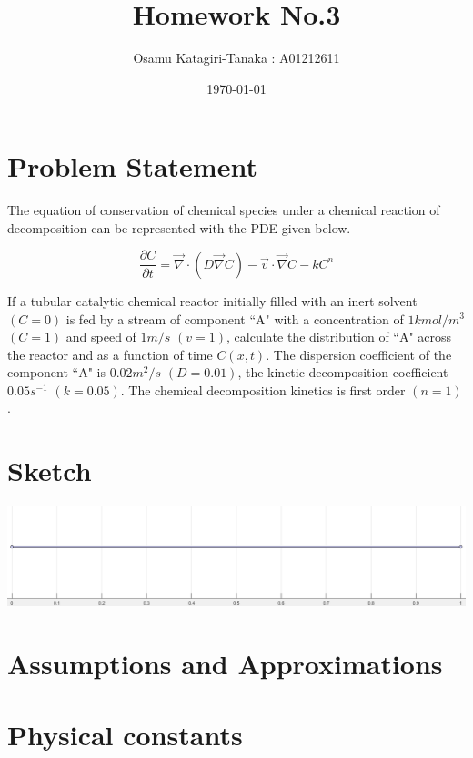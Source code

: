 \documentclass{article}
\title{Homework No.3}
\author{Osamu Katagiri-Tanaka : A01212611}
\date{\today}
\begin{document}
\maketitle

\section{Problem Statement}

The equation of conservation of chemical species under a chemical reaction of
decomposition can be represented with the PDE given below.

$$ \frac{\partial C}{\partial t} = \vec{\nabla} \cdot (D \vec{\nabla} C) - \vec{v} \cdot \vec{\nabla} C - k C^n $$

If a tubular catalytic chemical reactor initially filled with an inert solvent $(C = 0)$ is fed by a stream of component ``A" with a concentration of $1 kmol/m^3$ $(C = 1)$ and speed of $1 m/s$ $(v = 1)$, calculate the distribution of ``A" across the reactor and as a function of time $C(x, t)$. The dispersion coefficient of the component ``A" is $0.02 m^2/s$ $(D = 0.01)$, the kinetic decomposition coefficient $0.05 s^{-1}$ $(k = 0.05)$. The chemical decomposition kinetics is first order $(n = 1)$.

\section{Sketch}

\begin{center}
\includegraphics[width=\textwidth]{./img/Sketch.png}
\end{center}

\section{Assumptions and Approximations}


\section{Physical constants}
\end{document}
